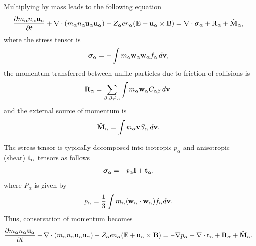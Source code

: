 \documentclass[a4paper,11pt]{report}
\begin{document}
Multiplying by mass leads to the following equation
\begin{equation}
\label{eq:mom_derv_5}
\frac{\partial m_\alpha n_\alpha \mathbf{u}_\alpha}{\partial t} + \nabla \cdot \left ( m_\alpha n_\alpha \mathbf{u}_\alpha \mathbf{u}_\alpha \right) - Z_\alpha e n_\alpha ( \mathbf{E} + \mathbf{u}_\alpha \times \mathbf{B} ) = \nabla \cdot \boldsymbol{\sigma}_\alpha + \mathbf{R}_\alpha + \hat{\mathbf{M}}_\alpha,
\end{equation}
where the stress tensor is
\begin{equation}
\boldsymbol{\sigma}_\alpha = -\int m_\alpha \mathbf{w}_\alpha \mathbf{w}_\alpha f_\alpha \, d\mathbf{v},
\end{equation}
the momentum transferred between unlike particles due to friction of collisions is
\begin{equation}
\mathbf{R}_\alpha = \sum_{\beta, \beta \ne \alpha} \int m_\alpha \mathbf{w}_\alpha C_{\alpha \beta} \, d\mathbf{v},
\end{equation}
and the external source of momentum is
\begin{equation}
\hat{\mathbf{M}}_\alpha = \int m_\alpha \mathbf{v} S_\alpha \, d\mathbf{v}.
\end{equation}
 

The stress tensor is typically decomposed into isotropic $p_\alpha$ and anisotropic (shear) $\mathbf{t}_\alpha$ tensors as follows
\begin{equation}
\boldsymbol{\sigma}_\alpha = - p_\alpha \mathbf{I} + \mathbf{t}_\alpha,
\end{equation}
where $P_\alpha$ is given by
\begin{equation}
p_\alpha = \frac{1}{3} \int m_\alpha (\mathbf{w}_\alpha \cdot \mathbf{w}_\alpha) f_\alpha d\mathbf{v}.
\end{equation}
Thus, conservation of momentum becomes
\begin{equation}
\label{eq:mom_derv_6}
\frac{\partial m_\alpha n_\alpha \mathbf{u}_\alpha}{\partial t} + \nabla \cdot \left ( m_\alpha n_\alpha \mathbf{u}_\alpha \mathbf{u}_\alpha \right) - Z_\alpha e n_\alpha ( \mathbf{E} + \mathbf{u}_\alpha \times \mathbf{B} ) = - \nabla p_\alpha + \nabla \cdot \mathbf{t}_\alpha + \mathbf{R}_\alpha + \hat{\mathbf{M}}_\alpha.
\end{equation}

\end{document}
